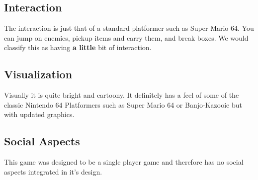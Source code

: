 \documentclass[journal]{IEEEtran}
\begin{document}
\subsection{Interaction}
The interaction is just that of a standard platformer such as Super Mario 64. You can jump on enemies, pickup items and carry them, and break boxes. 
We would classify this as having \textbf{a little} bit of interaction. 

\subsection{Visualization}
Visually it is quite bright and cartoony. It definitely has a feel of some of the classic Nintendo 64 Platformers such as Super Mario 64 or Banjo-Kazooie but with updated graphics. 

\subsection{Social Aspects}
This game was designed to be a single player game and therefore has no social aspects integrated in it's design.
\end{document}

